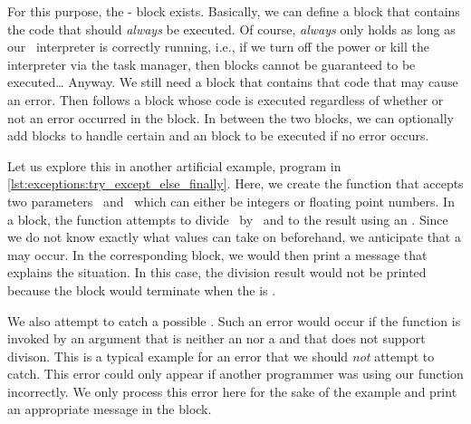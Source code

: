 For this purpose, the - block exists.
Basically, we can define a  block that contains the code that should \emph{always} be executed.
Of course, \emph{always} only holds as long as our \python\ interpreter is correctly running, i.e., if we turn off the power or kill the interpreter via the task manager, then  blocks cannot be guaranteed to be executed{\dots}
Anyway.
We still need a  block that contains that code that may cause an error.
Then follows a  block whose code is executed regardless of whether or not an error occurred in the  block.
In between the two blocks, we can optionally add  blocks to handle certain  and an  block to be executed if no error occurs.%
%
%
\FloatBarrier%
%
%
%
%
%
%
\begin{sloppypar}%
Let us explore this in another artificial example, program  in \cref{lst:exceptions:try_except_else_finally}.
Here, we create the function  that accepts two parameters~ and~ which can either be integers or floating point numbers.
In a  block, the function attempts to divide~ by~ and to  the result using an .
Since we do not know exactly what values  can take on beforehand, we anticipate that a  may occur.
In the corresponding  block, we would then print a message that explains the situation.
In this case, the division result would not be printed because the  block would terminate when the  is .%
\end{sloppypar}%
%
We also attempt to catch a possible .
Such an error would occur if the function is invoked by an argument that is neither an  nor a  and that does not support divison.
This is a typical example for an error that we should \emph{not} attempt to catch.
This error could only appear if another programmer was using our function incorrectly.
We only process this error here for the sake of the example and print an appropriate message in the  block.

